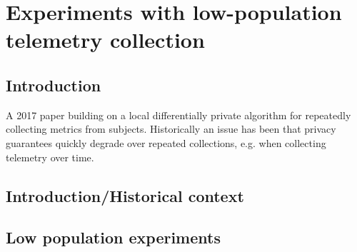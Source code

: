 \documentclass[12pt]{article}
\begin{document}
\section{Experiments with low-population telemetry collection}

\subsection{Introduction}

A 2017 paper building on a local differentially private algorithm for repeatedly collecting metrics from subjects. Historically an issue has been that privacy guarantees quickly degrade over repeated collections, e.g. when collecting telemetry over time.

\subsection{Introduction/Historical context}

\subsection{Low population experiments}
\end{document}
